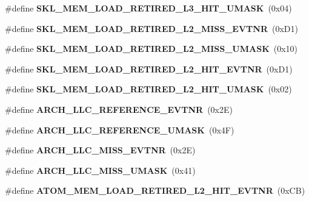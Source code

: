 \begin{DoxyCompactItemize}
\item 
\#define {\bfseries S\+K\+L\+\_\+\+M\+E\+M\+\_\+\+L\+O\+A\+D\+\_\+\+R\+E\+T\+I\+R\+E\+D\+\_\+\+L3\+\_\+\+H\+I\+T\+\_\+\+U\+M\+A\+SK}~(0x04)\label{types_8h_ab68abaf5e76ba2263d8edc91bd981641}

\item 
\#define {\bfseries S\+K\+L\+\_\+\+M\+E\+M\+\_\+\+L\+O\+A\+D\+\_\+\+R\+E\+T\+I\+R\+E\+D\+\_\+\+L2\+\_\+\+M\+I\+S\+S\+\_\+\+E\+V\+T\+NR}~(0x\+D1)\label{types_8h_a731f31563eab3830165bba40d8308a36}

\item 
\#define {\bfseries S\+K\+L\+\_\+\+M\+E\+M\+\_\+\+L\+O\+A\+D\+\_\+\+R\+E\+T\+I\+R\+E\+D\+\_\+\+L2\+\_\+\+M\+I\+S\+S\+\_\+\+U\+M\+A\+SK}~(0x10)\label{types_8h_a15e2d3230e4bc258e98b6402ec979604}

\item 
\#define {\bfseries S\+K\+L\+\_\+\+M\+E\+M\+\_\+\+L\+O\+A\+D\+\_\+\+R\+E\+T\+I\+R\+E\+D\+\_\+\+L2\+\_\+\+H\+I\+T\+\_\+\+E\+V\+T\+NR}~(0x\+D1)\label{types_8h_ae76cffc977414878e4679418e2a111ac}

\item 
\#define {\bfseries S\+K\+L\+\_\+\+M\+E\+M\+\_\+\+L\+O\+A\+D\+\_\+\+R\+E\+T\+I\+R\+E\+D\+\_\+\+L2\+\_\+\+H\+I\+T\+\_\+\+U\+M\+A\+SK}~(0x02)\label{types_8h_a702e0ea81d8768b347fc48d7cbd7a1e7}

\item 
\#define {\bfseries A\+R\+C\+H\+\_\+\+L\+L\+C\+\_\+\+R\+E\+F\+E\+R\+E\+N\+C\+E\+\_\+\+E\+V\+T\+NR}~(0x2\+E)\label{types_8h_a833581dd45657cb5f0a43d4a0bea3303}

\item 
\#define {\bfseries A\+R\+C\+H\+\_\+\+L\+L\+C\+\_\+\+R\+E\+F\+E\+R\+E\+N\+C\+E\+\_\+\+U\+M\+A\+SK}~(0x4\+F)\label{types_8h_a814bebc63a979bfe25932aec1e4f3e65}

\item 
\#define {\bfseries A\+R\+C\+H\+\_\+\+L\+L\+C\+\_\+\+M\+I\+S\+S\+\_\+\+E\+V\+T\+NR}~(0x2\+E)\label{types_8h_a557e0af84a53fe702dbf6c426f01a430}

\item 
\#define {\bfseries A\+R\+C\+H\+\_\+\+L\+L\+C\+\_\+\+M\+I\+S\+S\+\_\+\+U\+M\+A\+SK}~(0x41)\label{types_8h_a9844e9cf0b1be6e377394aa0f36c0cc9}

\item 
\#define {\bfseries A\+T\+O\+M\+\_\+\+M\+E\+M\+\_\+\+L\+O\+A\+D\+\_\+\+R\+E\+T\+I\+R\+E\+D\+\_\+\+L2\+\_\+\+H\+I\+T\+\_\+\+E\+V\+T\+NR}~(0x\+C\+B)\label{types_8h_ae22b6f56994cf7ace060db72ae78ed02}


\end{DoxyCompactItemize}
